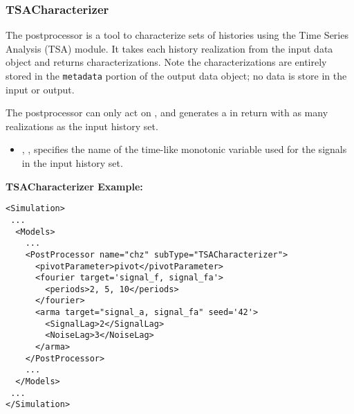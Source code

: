 







%

\subsubsection{TSACharacterizer}
\label{TSACharacterizer}
The  postprocessor is a tool to characterize sets of histories using
the Time Series Analysis (TSA) module. It takes each history realization from the input data object
and returns characterizations. Note the characterizations are entirely stored in the \texttt{metadata}
portion of the output data object; no data is store in the input or output.

The  postprocessor can only act on  ,
and generates a   in return with as many realizations as the input
history set.

%
\begin{itemize}
  \item {}, , specifies the name of the time-like
    monotonic variable used for the signals in the input history set.
\end{itemize}

\tsaList

\textbf{TSACharacterizer Example:}

\begin{lstlisting}[style=XML]
<Simulation>
 ...
  <Models>
    ...
    <PostProcessor name="chz" subType="TSACharacterizer">
      <pivotParameter>pivot</pivotParameter>
      <fourier target='signal_f, signal_fa'>
        <periods>2, 5, 10</periods>
      </fourier>
      <arma target="signal_a, signal_fa" seed='42'>
        <SignalLag>2</SignalLag>
        <NoiseLag>3</NoiseLag>
      </arma>
    </PostProcessor>
    ...
  </Models>
 ...
</Simulation>
\end{lstlisting}
